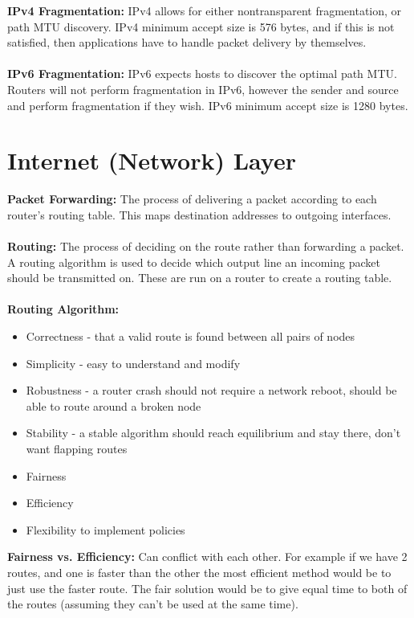 \documentclass[a4paper,10pt]{article}
\begin{document}
\textcolor{Peach}{\textbf{IPv4 Fragmentation:}} IPv4 allows for either nontransparent fragmentation, or path MTU discovery. IPv4 minimum accept size is 576 bytes, and if this is not satisfied, then applications have to handle packet delivery by themselves. \\\\
\textcolor{Peach}{\textbf{IPv6 Fragmentation:}} IPv6 expects hosts to discover the optimal path MTU. Routers will not perform fragmentation in IPv6, however the sender and source and perform fragmentation if they wish. IPv6 minimum accept size is 1280 bytes. 
\section{Internet (Network) Layer}
\textcolor{Melon}{\textbf{Packet Forwarding:}} The process of delivering a packet according to each router's routing table. This maps destination addresses to outgoing interfaces. \\\\
\textcolor{Melon}{\textbf{Routing:}} The process of deciding on the route rather than forwarding a packet. A routing algorithm is used to decide which output line an incoming packet should be transmitted on. These are run on a router to create a routing table. \\\\
\textcolor{Melon}{\textbf{Routing Algorithm:}} 
\begin{itemize}
	\item Correctness - that a valid route is found between all pairs of nodes 
	\item Simplicity - easy to understand and modify 
	\item Robustness - a router crash should not require a network reboot, should be able to route around a broken node 
	\item Stability - a stable algorithm should reach equilibrium and stay there, don't want flapping routes 
	\item Fairness 
	\item Efficiency 
	\item Flexibility to implement policies  
\end{itemize}
\textcolor{Melon}{\textbf{Fairness vs. Efficiency:}} Can conflict with each other. For example if we have 2 routes, and one is faster than the other the most efficient method would be to just use the faster route. The fair solution would be to give equal time to both of the routes (assuming they can't be used at the same time). \\\\
\end{document}
